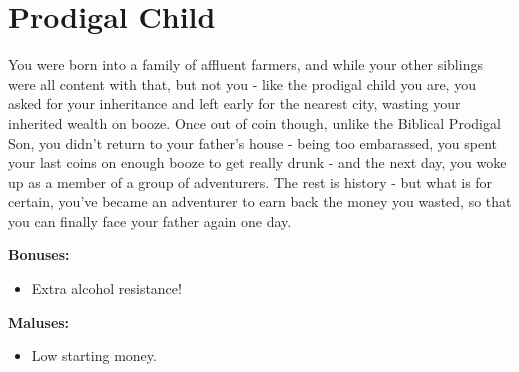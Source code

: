 \section{Prodigal Child}
You were born into a family of affluent farmers, and while your other siblings were all content with that, but not you - like the prodigal child you are, you asked for your inheritance and left early for the nearest city, wasting your inherited wealth on booze. Once out of coin though, unlike the Biblical Prodigal Son, you didn't return to your father's house - being too embarassed, you spent your last coins on enough booze to get really drunk - and the next day, you woke up as a member of a group of adventurers. The rest is history - but what is for certain, you've became an adventurer to earn back the money you wasted, so that you can finally face your father again one day.


\textbf{Bonuses:}
\begin{itemize}
	\item Extra alcohol resistance!
\end{itemize}
\textbf{Maluses:}
\begin{itemize}
	\item Low starting money.
\end{itemize}
